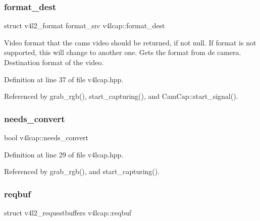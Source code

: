 \mbox{\label{classv4lcap_a51d51cae7bdc2fe6aa5bec4ddbeb6c31}} 
\subsubsection{\texorpdfstring{format\+\_\+dest}{format\_dest}}
{\footnotesize\ttfamily struct v4l2\+\_\+format format\+\_\+src v4lcap\+::format\+\_\+dest}



Video format that the cam\textquotesingle{}s video should be returned, if not null. If format is not supported, this will change to another one.  Gets the format from de camera.  Destination format of the video. 



Definition at line 37 of file v4lcap.\+hpp.



Referenced by grab\+\_\+rgb(), start\+\_\+capturing(), and Cam\+Cap\+::start\+\_\+signal().

\mbox{\label{classv4lcap_acd02d2da6ff03a44a2e155af449144e4}} 
\subsubsection{\texorpdfstring{needs\+\_\+convert}{needs\_convert}}
{\footnotesize\ttfamily bool v4lcap\+::needs\+\_\+convert}



Definition at line 29 of file v4lcap.\+hpp.



Referenced by grab\+\_\+rgb(), and start\+\_\+capturing().

\mbox{\label{classv4lcap_a4b98d5a7e7859a8e234d54649ea9251e}} 
\subsubsection{\texorpdfstring{reqbuf}{reqbuf}}
{\footnotesize\ttfamily struct v4l2\+\_\+requestbuffers v4lcap\+::reqbuf}



